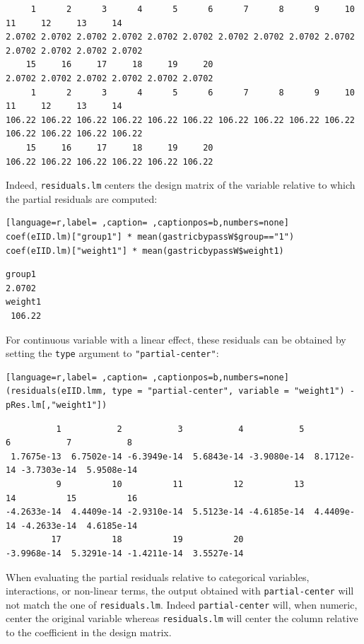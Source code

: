 \documentclass[12pt]{article}
\newcommand\Warning[1][3ex]{%
\renewcommand\stacktype{L}%
\scaleto{\stackon[1.3pt]{\color{red}$\triangle$}{\tiny\bfseries !}}{#1}%
\xspace
}
\begin{document}
\begin{verbatim}
     1      2      3      4      5      6      7      8      9     10     11     12     13     14 
2.0702 2.0702 2.0702 2.0702 2.0702 2.0702 2.0702 2.0702 2.0702 2.0702 2.0702 2.0702 2.0702 2.0702 
    15     16     17     18     19     20 
2.0702 2.0702 2.0702 2.0702 2.0702 2.0702
     1      2      3      4      5      6      7      8      9     10     11     12     13     14 
106.22 106.22 106.22 106.22 106.22 106.22 106.22 106.22 106.22 106.22 106.22 106.22 106.22 106.22 
    15     16     17     18     19     20 
106.22 106.22 106.22 106.22 106.22 106.22
\end{verbatim}


Indeed, \texttt{residuals.lm} centers the design matrix of the variable
relative to which the partial residuals are computed:
\begin{lstlisting}[language=r,label= ,caption= ,captionpos=b,numbers=none]
coef(eIID.lm)["group1"] * mean(gastricbypassW$group=="1")
coef(eIID.lm)["weight1"] * mean(gastricbypassW$weight1)
\end{lstlisting}

\begin{verbatim}
group1 
2.0702
weight1 
 106.22
\end{verbatim}


For continuous variable with a linear effect, these residuals can be
obtained by setting the \texttt{type} argument to \texttt{"partial-center"}:
\begin{lstlisting}[language=r,label= ,caption= ,captionpos=b,numbers=none]
(residuals(eIID.lmm, type = "partial-center", variable = "weight1") - pRes.lm[,"weight1"])
\end{lstlisting}

\begin{verbatim}
          1           2           3           4           5           6           7           8 
 1.7675e-13  6.7502e-14 -6.3949e-14  5.6843e-14 -3.9080e-14  8.1712e-14 -3.7303e-14  5.9508e-14 
          9          10          11          12          13          14          15          16 
-4.2633e-14  4.4409e-14 -2.9310e-14  5.5123e-14 -4.6185e-14  4.4409e-14 -4.2633e-14  4.6185e-14 
         17          18          19          20 
-3.9968e-14  5.3291e-14 -1.4211e-14  3.5527e-14
\end{verbatim}


\Warning When evaluating the partial residuals relative to categorical
variables, interactions, or non-linear terms, the output obtained with
\texttt{partial-center} will not match the one of \texttt{residuals.lm}. Indeed
\texttt{partial-center} will, when numeric, center the original variable
whereas \texttt{residuals.lm} will center the column relative to the
coefficient in the design matrix.
\end{document}
